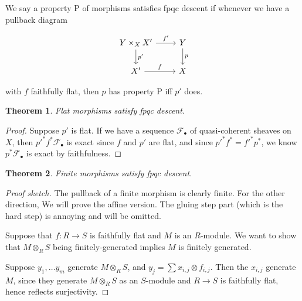 \documentclass{shortart}
\newtheorem*{thm}{Theorem}
\theoremstyle{definition}
\newcommand*{\Cdot}{\bullet}
\newcommand*{\Cdot}{{\raisebox{-0.25ex}{\scalebox{1.5}{$\cdot$}}}}
\begin{document}
We say a property P of morphisms satisfies fpqc descent if whenever we have a pullback diagram
\begin{useimager}
  \[
    \begin{tikzcd}
      Y \times_X X' \ar[d, "p'"] \ar[r, "f'"] & Y \ar[d, "p"]\\
      X' \ar[r, "f"] & X
    \end{tikzcd}
  \]
\end{useimager}
with $f$ faithfully flat, then $p$ has property P iff $p'$ does.
\begin{thm}
  Flat morphisms satisfy fpqc descent.
\end{thm}

\begin{proof}
  Suppose $p'$ is flat. If we have a sequence $\mathcal{F}_\Cdot$ of quasi-coherent sheaves on $X$, then $p'^* f^* \mathcal{F}_\Cdot$ is exact since $f$ and $p'$ are flat, and since $p'^* f^* = f'^* p^*$, we know $p^* \mathcal{F}_\Cdot$ is exact by faithfulness.
\end{proof}

\begin{thm}
  Finite morphisms satisfy fpqc descent.
\end{thm}

\begin{proof}[Proof sketch]
  The pullback of a finite morphism is clearly finite. For the other direction, We will prove the affine version. The gluing step part (which is the hard step) is annoying and will be omitted.

  Suppose that $f: R \to S$ is faithfully flat and $M$ is an $R$-module. We want to show that $M \otimes_R S$ being finitely-generated implies $M$ is finitely generated.
  
  Suppose $y_1, \ldots y_m$ generate $M \otimes_R S$, and $y_j = \sum x_{i, j} \otimes f_{i, j}$. Then the $x_{i, j}$ generate $M$, since they generate $M \otimes_R S$ as an $S$-module and $R \to S$ is faithfully flat, hence reflects surjectivity.
\end{proof}


\end{document}
